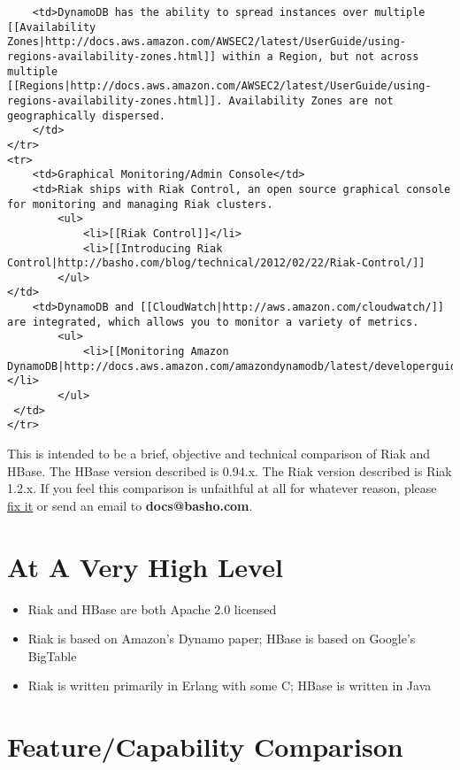 \documentclass[letter]{book}
\begin{document}
\begin{shaded}
\begin{verbatim}
    <td>DynamoDB has the ability to spread instances over multiple [[Availability Zones|http://docs.aws.amazon.com/AWSEC2/latest/UserGuide/using-regions-availability-zones.html]] within a Region, but not across multiple [[Regions|http://docs.aws.amazon.com/AWSEC2/latest/UserGuide/using-regions-availability-zones.html]]. Availability Zones are not geographically dispersed.
    </td>
</tr>
<tr>
    <td>Graphical Monitoring/Admin Console</td>
    <td>Riak ships with Riak Control, an open source graphical console for monitoring and managing Riak clusters.
        <ul>
            <li>[[Riak Control]]</li>
            <li>[[Introducing Riak Control|http://basho.com/blog/technical/2012/02/22/Riak-Control/]]
        </ul>
</td>
    <td>DynamoDB and [[CloudWatch|http://aws.amazon.com/cloudwatch/]] are integrated, which allows you to monitor a variety of metrics.
        <ul>
            <li>[[Monitoring Amazon DynamoDB|http://docs.aws.amazon.com/amazondynamodb/latest/developerguide/MonitoringDynamoDB.html]]</li>
        </ul>
 </td>
</tr>
\end{verbatim}\end{shaded}

This is intended to be a brief, objective and technical comparison of Riak and HBase. The HBase version described is 0.94.x. The Riak version described is Riak 1.2.x. If you feel this comparison is unfaithful at all for whatever reason, please \href{https://github.com/basho/basho_docs/issues/new}{fix it} or send an email to \textbf{docs@basho.com}.

\section{At A Very High Level}\label{at-a-very-high-level-4}

\begin{itemize}
\itemsep1pt\parskip0pt
\item
  Riak and HBase are both Apache 2.0 licensed
\item
  Riak is based on Amazon's Dynamo paper; HBase is based on Google's BigTable
\item
  Riak is written primarily in Erlang with some C; HBase is written in Java
\end{itemize}

\section{Feature/Capability Comparison}\label{featurecapability-comparison-4}
\end{document}
